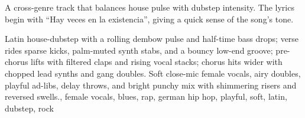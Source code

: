 

\begin{notes}
A cross-genre track that balances house pulse with dubstep intensity. %
The lyrics begin with “Hay veces en la existencia”, giving a quick sense of the song’s tone.
\end{notes}

\begin{style}
Latin house-dubstep with a rolling dembow pulse and half-time bass drops; verse rides sparse kicks, palm-muted synth stabs, and a bouncy low-end groove; pre-chorus lifts with filtered claps and rising vocal stacks; chorus hits wider with chopped lead synths and gang doubles. %
Soft close-mic female vocals, airy doubles, playful ad-libs, delay throws, and bright punchy mix with shimmering risers and reversed swells., female vocals, blues, rap, german hip hop, playful, soft, latin, dubstep, rock
\end{style}

